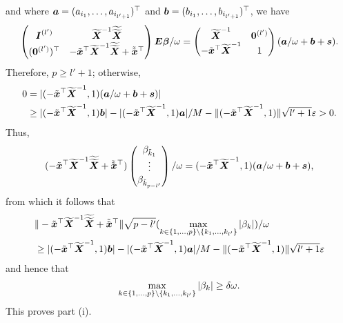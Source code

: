 \documentclass[12pt]{article}
\def\ep{{\varepsilon}}
\def\be{{\beta}}
\def\de{{\delta}}
\def\ep{{\varepsilon}}
\def\om{{\omega}}
\def\non{{\nonumber}}
\def\be{{\beta}}
\def\de{{\delta}}
\def\ep{{\varepsilon}}
\def\om{{\omega}}
\def\bbe{{\text{\boldmath $\beta$}}}
\def\a{{\text{\boldmath $a$}}}
\def\b{{\text{\boldmath $b$}}}
\def\s{{\text{\boldmath $s$}}}
\def\x{{\text{\boldmath $x$}}}
\def\E{{\text{\boldmath $E$}}}
\def\I{{\text{\boldmath $I$}}}
\def\X{{\text{\boldmath $X$}}}
\def\xbt{{\tilde \x}}
\def\kt{{\tilde k}}
\def\Xbt{{\widetilde \X}}
\def\non{{\nonumber}}
\begin{document}
and where $\a = ( a_{i_1} , \dots , a_{i_{l' + 1}} )^{\top }$ and $\b = ( b_{i_1} , \dots , b_{i_{l' + 1}} )^{\top }$, we have 
\begin{align}
\begin{pmatrix} \I ^{( l' )} & \Xbt ^{- 1} \widetilde{\Xbt } \\ ( \bm{0} ^{( l' )} )^{\top } & - \xbt ^{\top } \Xbt ^{- 1} \widetilde{\Xbt } + \tilde{\xbt } ^{\top } \end{pmatrix} \E \bbe / \om = \begin{pmatrix} \Xbt ^{- 1} & \bm{0} ^{( l' )} \\ - \xbt ^{\top } \Xbt ^{- 1} & 1 \end{pmatrix} ( \a / \om + \b + \s ) \text{.} \non 
\end{align}
Therefore, $p \ge l' + 1$; otherwise, 
\begin{align}
0 &= |(- \xbt ^{\top } \Xbt ^{- 1} , 1) ( \a / \om + \b + \s )| \non \\
&\ge |(- \xbt ^{\top } \Xbt ^{- 1} , 1) \b | - |(- \xbt ^{\top } \Xbt ^{- 1} , 1) \a | / M - \| (- \xbt ^{\top } \Xbt ^{- 1} , 1) \| \sqrt{l' + 1} \ep > 0 \text{.} \non 
\end{align}
Thus, 
\begin{align}
(- \xbt ^{\top } \Xbt ^{- 1} \widetilde{\Xbt } + \tilde{\xbt } ^{\top } ) \begin{pmatrix} \be _{\kt _1} \\ \vdots \\ \be _{\kt _{p - l'}} \end{pmatrix} / \om = (- \xbt ^{\top } \Xbt ^{- 1} , 1) ( \a / \om + \b + \s ) \text{,} \non 
\end{align}
from which it follows that 
\begin{align}
&\| - \xbt ^{\top } \Xbt ^{- 1} \widetilde{\Xbt } + \tilde{\xbt } ^{\top } \| \sqrt{p - l'} ( \max_{k \in \{ 1, \dots , p \} \setminus \{ k_1 , \dots , k_{l'} \} } | \be _k |) / \om \non \\
&\ge |(- \xbt ^{\top } \Xbt ^{- 1} , 1) \b | - |( - \xbt ^{\top } \Xbt ^{- 1} , 1) \a | / M - \| (- \xbt ^{\top } \Xbt ^{- 1} , 1) \| \sqrt{l' + 1} \ep \non 
\end{align}
and hence that 
\begin{align}
\max_{k \in \{ 1, \dots , p \} \setminus \{ k_1 , \dots , k_{l'} \} } | \be _k | \ge \de \om \text{.} \non 
\end{align}
This proves part (i). 
\end{document}
